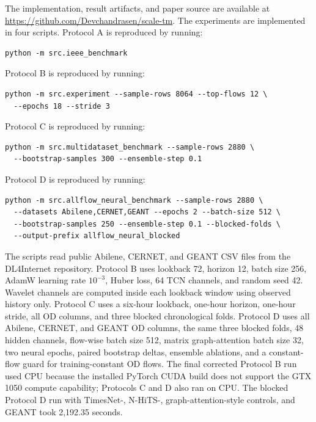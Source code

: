 \documentclass{article}
\begin{document}
The implementation, result artifacts, and paper source are available at \url{https://github.com/Devchandrasen/scale-tm}. The experiments are implemented in four scripts. Protocol A is reproduced by running:
\begin{verbatim}
python -m src.ieee_benchmark
\end{verbatim}
Protocol B is reproduced by running:
\begin{verbatim}
python -m src.experiment --sample-rows 8064 --top-flows 12 \
  --epochs 18 --stride 3
\end{verbatim}
Protocol C is reproduced by running:
\begin{verbatim}
python -m src.multidataset_benchmark --sample-rows 2880 \
  --bootstrap-samples 300 --ensemble-step 0.1
\end{verbatim}
Protocol D is reproduced by running:
\begin{verbatim}
python -m src.allflow_neural_benchmark --sample-rows 2880 \
  --datasets Abilene,CERNET,GEANT --epochs 2 --batch-size 512 \
  --bootstrap-samples 250 --ensemble-step 0.1 --blocked-folds \
  --output-prefix allflow_neural_blocked
\end{verbatim}
The scripts read public Abilene, CERNET, and GEANT CSV files from the DL4Internet repository. Protocol B uses lookback 72, horizon 12, batch size 256, AdamW learning rate $10^{-3}$, Huber loss, 64 TCN channels, and random seed 42. Wavelet channels are computed inside each lookback window using observed history only. Protocol C uses a six-hour lookback, one-hour horizon, one-hour stride, all OD columns, and three blocked chronological folds. Protocol D uses all Abilene, CERNET, and GEANT OD columns, the same three blocked folds, 48 hidden channels, flow-wise batch size 512, matrix graph-attention batch size 32, two neural epochs, paired bootstrap deltas, ensemble ablations, and a constant-flow guard for training-constant OD flows. The final corrected Protocol B run used CPU because the installed PyTorch CUDA build does not support the GTX 1050 compute capability; Protocols C and D also ran on CPU. The blocked Protocol D run with TimesNet-, N-HiTS-, graph-attention-style controls, and GEANT took 2,192.35 seconds.
\end{document}

